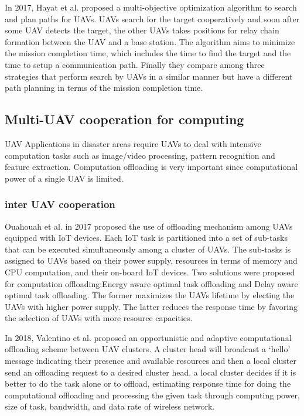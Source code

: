 \documentclass{ieeeaccess}
\begin{document}
In 2017, Hayat et al. proposed a multi-objective optimization algorithm to search and plan paths for UAVs\cite{Hayat 2017}.
UAVs search for the target cooperatively and soon after some UAV detects the target, the other UAVs takes positions for relay chain formation between the UAV and a base station.
The algorithm aims to minimize the mission completion time, which includes the time to find the target and the time to setup a communication path.
Finally they compare among three strategies that perform search by UAVs in a similar manner but have a different path planning in terms of the mission completion time.

\subsection{Multi-UAV cooperation for computing}\label{compute}
UAV Applications in disaster areas require UAVs to deal with intensive computation tasks such as image/video processing, pattern recognition and feature extraction. 
Computation offloading is very important since computational power of a single UAV is limited.
\subsubsection{inter UAV cooperation}
Ouahouah et al. in 2017 proposed the use of offloading mechanism among UAVs equipped with IoT devices\cite{Ouahouah2017}.
Each IoT task is partitioned into a set of sub-tasks that can be executed simultaneously among a cluster of UAVs.
The sub-tasks is assigned to UAVs based on their power supply, resources in terms of memory and CPU computation, and their on-board IoT devices.
Two solutions were proposed for  computation offloading:Energy aware optimal task offloading and Delay aware optimal task offloading.
The former maximizes the UAVs lifetime by electing the UAVs with higher power supply.
The latter reduces the response time by favoring the selection of UAVs with more resource capacities.

In 2018, Valentino et al. proposed an opportunistic and adaptive computational offloading scheme between UAV clusters\cite{Valentino2018}.
A cluster head will broadcast a ‘hello’ message indicating their presence and available resources and then a local cluster send an offloading request to a desired cluster head.
a local cluster decides if it is better to do the task alone or to offload, estimating response time for doing the computational offloading and processing the given task through computing power, size of task, bandwidth, and data rate of wireless network.
\end{document}
